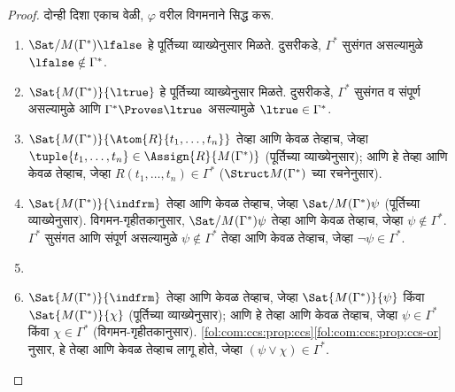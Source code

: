 \begin{proof}
दोन्ही दिशा एकाच वेळी, $\varphi$ वरील विगमनाने सिद्ध करू.
\begin{enumerate}
\item \indcase{\varphi}{\lfalse}
  {$\Sat/{M(\Gamma^*)}{\lfalse}$
    हे पूर्तिच्या व्याख्येनुसार मिळते. दुसरीकडे, $\Gamma^*$ सुसंगत
    असल्यामुळे $\lfalse \notin \Gamma^*$.}

\item \indcase{\varphi}{\ltrue}
  {$\Sat{M(\Gamma^*)}{\ltrue}$
    हे पूर्तिच्या व्याख्येनुसार मिळते. दुसरीकडे, $\Gamma^*$ सुसंगत व
    संपूर्ण असल्यामुळे आणि $\Gamma^* \Proves \ltrue$ असल्यामुळे
    $\ltrue \in \Gamma^*$.}

\item {}
  {$\Sat{M(\Gamma^*)}{\Atom{R}{t_1, \dots, t_n}}$ तेव्हा आणि केवळ तेव्हाच,
    जेव्हा $\tuple{t_1, \dots, t_n} \in \Assign{R}{M(\Gamma^*)}$
    (पूर्तिच्या व्याख्येनुसार); आणि हे तेव्हा आणि केवळ तेव्हाच, जेव्हा
    $R(t_1, \dots, t_n) \in \Gamma^*$ ($\Struct M(\Gamma^*)$ च्या
    रचनेनुसार).}

\item
  \indcase{\varphi}{\lnot \psi}
    {$\Sat{M(\Gamma^*)}{\indfrm}$ तेव्हा
    आणि केवळ तेव्हाच, जेव्हा
    $\Sat/{M(\Gamma^*)}{\psi}$
    (पूर्तिच्या व्याख्येनुसार). विगमन-गृहीतकानुसार,
    $\Sat/{M(\Gamma^*)}{\psi}$ तेव्हा
    आणि केवळ तेव्हाच, जेव्हा $\psi \notin \Gamma^*$. $\Gamma^*$ सुसंगत
    आणि संपूर्ण असल्यामुळे $\psi \notin \Gamma^*$ तेव्हा आणि केवळ
    तेव्हाच, जेव्हा $\lnot \psi \in \Gamma^*$.}

\item


\item

  \indcase{\varphi}{\psi \lor \chi}
    {$\Sat{M(\Gamma^*)}{\indfrm}$
    तेव्हा आणि केवळ तेव्हाच, जेव्हा
    $\Sat{M(\Gamma^*)}{\psi}$ किंवा
    $\Sat{M(\Gamma^*)}{\chi}$
    (पूर्तिच्या व्याख्येनुसार); आणि हे तेव्हा आणि केवळ तेव्हाच, जेव्हा
    $\psi \in \Gamma^*$ किंवा $\chi \in \Gamma^*$ (विगमन-गृहीतकानुसार).
    \ref{fol:com:ccs:prop:ccs}\ref{fol:com:ccs:prop:ccs-or} नुसार, हे तेव्हा आणि
    केवळ तेव्हाच लागू होते, जेव्हा $(\psi \lor \chi) \in \Gamma^*$.}


\end{enumerate}
\end{proof}
